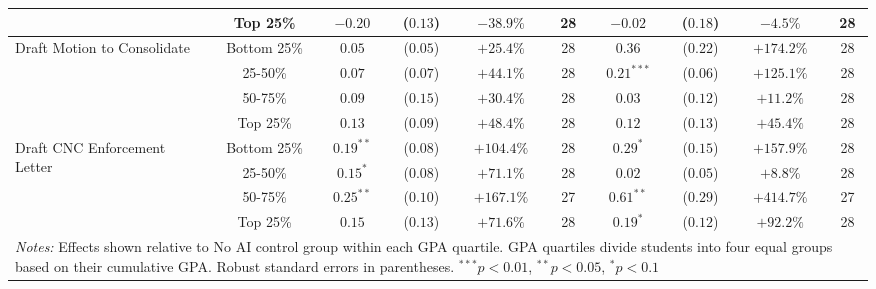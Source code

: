 \begin{table}[!htbp]
\begin{tabular}{lccccccccc}
& Top 25\% & $-0.20$ & ($0.13$) & $-38.9\%$ & 28 & $-0.02$ & ($0.18$) & $-4.5\%$ & 28 \\
\hline
\multirow{4}{*}{Draft Motion to Consolidate} & Bottom 25\% & $0.05$ & ($0.05$) & $+25.4\%$ & 28 & $0.36$ & ($0.22$) & $+174.2\%$ & 28 \\
& 25-50\% & $0.07$ & ($0.07$) & $+44.1\%$ & 28 & $0.21^{***}$ & ($0.06$) & $+125.1\%$ & 28 \\
& 50-75\% & $0.09$ & ($0.15$) & $+30.4\%$ & 28 & $0.03$ & ($0.12$) & $+11.2\%$ & 28 \\
& Top 25\% & $0.13$ & ($0.09$) & $+48.4\%$ & 28 & $0.12$ & ($0.13$) & $+45.4\%$ & 28 \\
\hline
\multirow{4}{*}{Draft CNC Enforcement Letter} & Bottom 25\% & $0.19^{**}$ & ($0.08$) & $+104.4\%$ & 28 & $0.29^{*}$ & ($0.15$) & $+157.9\%$ & 28 \\
& 25-50\% & $0.15^{*}$ & ($0.08$) & $+71.1\%$ & 28 & $0.02$ & ($0.05$) & $+8.8\%$ & 28 \\
& 50-75\% & $0.25^{**}$ & ($0.10$) & $+167.1\%$ & 27 & $0.61^{**}$ & ($0.29$) & $+414.7\%$ & 27 \\
& Top 25\% & $0.15$ & ($0.13$) & $+71.6\%$ & 28 & $0.19^{*}$ & ($0.12$) & $+92.2\%$ & 28 \\
\hline
\multicolumn{10}{p{0.95\linewidth}}{\footnotesize \textit{Notes:} Effects shown relative to No AI control group within each GPA quartile. GPA quartiles divide students into four equal groups based on their cumulative GPA. Robust standard errors in parentheses. $^{***}p<0.01$, $^{**}p<0.05$, $^{*}p<0.1$}
\end{tabular}
\end{table}

